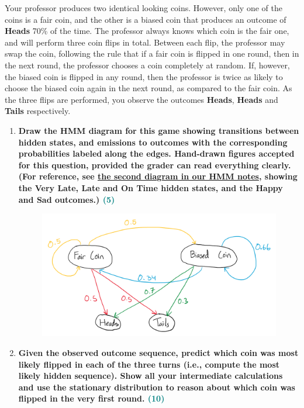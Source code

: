 \documentclass[a4paper]{article}
\begin{document}
\begin{sloppypar}
\noindent Your professor produces two identical looking coins. However, only one of the coins is a
fair coin, and the other is a biased coin that produces an outcome of \textbf{Heads} 70\% of the
time. The professor always knows which coin is the fair one, and will perform three coin
flips in total. Between each flip, the professor may swap the coin, following the rule that
if a fair coin is flipped in one round, then in the next round, the professor chooses a coin
completely at random. If, however, the biased coin is flipped in any round, then the professor 
is twice as likely to choose the biased coin again in the next round, as compared to
the fair coin. As the three flips are performed, you observe the outcomes \textbf{Heads}, \textbf{Heads}
and \textbf{Tails} respectively.


\begin{enumerate}[start=6,label=Q\arabic*,left=0pt]
    \item \textbf{Draw the HMM diagram for this game showing transitions between hidden states,
    and emissions to outcomes with the corresponding probabilities labeled along the edges.
    Hand-drawn figures accepted for this question, provided the grader can read everything
    clearly. (For reference, see \href{https://rajagopalvenkat.com/teaching/resources/AI/ch6.html\#hmm}{the second diagram in our HMM notes}, showing the Very Late,
    Late and On Time hidden states, and the Happy and Sad outcomes.) \hfill \textcolor{teal}{(5)}}

    \begin{figure}[H]
        \centering  
        \includegraphics[height=0.3\textheight]{Q6_hmm.png}
        \label{fig:Q6_hmm}
    \end{figure}

    \item \textbf{Given the observed outcome sequence, predict which coin was most likely flipped
    in each of the three turns (i.e., compute the most likely hidden sequence). Show all your
    intermediate calculations and use the stationary distribution to reason about which coin
    was flipped in the very first round. \hfill \textcolor{teal}{(10)}}


\end{enumerate}
\end{sloppypar}
\end{document}
